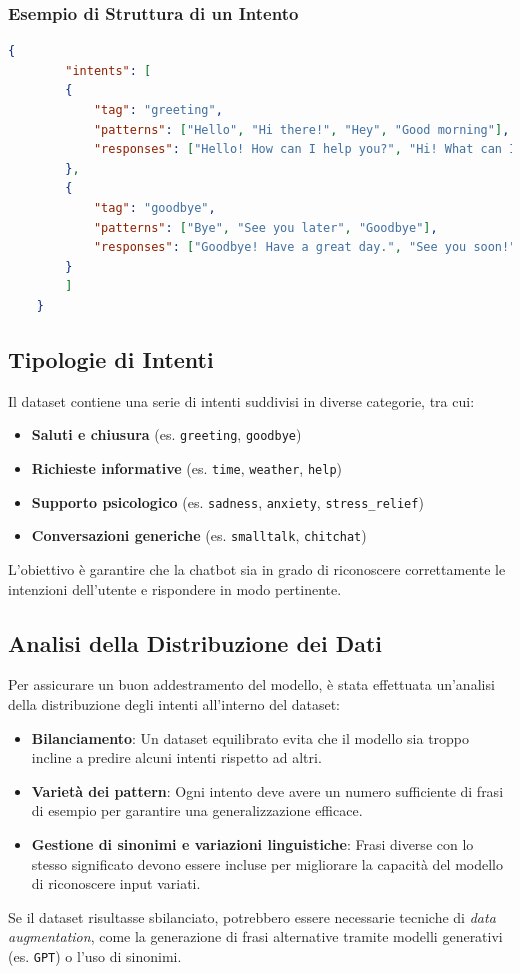 \documentclass[12pt, letterpaper]{article}
\begin{document}
\subsubsection{Esempio di Struttura di un Intento}
\begin{lstlisting}[language=json, label={lst:intent_example}]
	{
		"intents": [
		{
			"tag": "greeting",
			"patterns": ["Hello", "Hi there!", "Hey", "Good morning"],
			"responses": ["Hello! How can I help you?", "Hi! What can I do for you?"]
		},
		{
			"tag": "goodbye",
			"patterns": ["Bye", "See you later", "Goodbye"],
			"responses": ["Goodbye! Have a great day.", "See you soon!"]
		}
		]
	}
\end{lstlisting}

\subsection{Tipologie di Intenti}
Il dataset contiene una serie di intenti suddivisi in diverse categorie, tra cui:
\begin{itemize}
	\item \textbf{Saluti e chiusura} (es. \texttt{greeting}, \texttt{goodbye})
	\item \textbf{Richieste informative} (es. \texttt{time}, \texttt{weather}, \texttt{help})
	\item \textbf{Supporto psicologico} (es. \texttt{sadness}, \texttt{anxiety}, \texttt{stress\_relief})
	\item \textbf{Conversazioni generiche} (es. \texttt{smalltalk}, \texttt{chitchat})
\end{itemize}
L’obiettivo è garantire che la chatbot sia in grado di riconoscere correttamente le intenzioni dell’utente e rispondere in modo pertinente.

\subsection{Analisi della Distribuzione dei Dati}
Per assicurare un buon addestramento del modello, è stata effettuata un’analisi della distribuzione degli intenti all’interno del dataset:
\begin{itemize}
\item \textbf{Bilanciamento}: Un dataset equilibrato evita che il modello sia troppo incline a predire alcuni intenti rispetto ad altri.
\item \textbf{Varietà dei pattern}: Ogni intento deve avere un numero sufficiente di frasi di esempio per garantire una generalizzazione efficace.
\item \textbf{Gestione di sinonimi e variazioni linguistiche}: Frasi diverse con lo stesso significato devono essere incluse per migliorare la capacità del modello di riconoscere input variati.
\end{itemize}
Se il dataset risultasse sbilanciato, potrebbero essere necessarie tecniche di \textit{data augmentation}, come la generazione di frasi alternative tramite modelli generativi (es. \texttt{GPT}) o l’uso di sinonimi.
\end{document}
